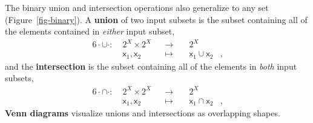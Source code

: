 \documentclass[
  letterpaper,
  DIV=11,
  numbers=noendperiod]{scrartcl}
\begin{document}
The binary union and intersection operations also generalize to any set
(Figure~\ref{fig-binary}). A \textbf{union} of two input subsets is the
subset containing all of the elements contained in \emph{either} input
subset, \begin{alignat*}{6}
\cdot \cup \cdot :\; & 2^{X} \times 2^{X}& &\rightarrow& \; & 2^{X} &
\\
& \mathsf{x}_1, \mathsf{x}_{2} & &\mapsto& & \mathsf{x}_1 \cup \mathsf{x}_2 &,
\end{alignat*} and the \textbf{intersection} is the subset containing
all of the elements in \emph{both} input subsets, \begin{alignat*}{6}
\cdot \cap \cdot :\; & 2^{X} \times 2^{X}& &\rightarrow& \; & 2^{X} &
\\
& \mathsf{x}_1, \mathsf{x}_{2} & &\mapsto& & \mathsf{x}_1 \cap \mathsf{x}_2 &,
\end{alignat*} \textbf{Venn diagrams} visualize unions and intersections
as overlapping shapes.
\end{document}
